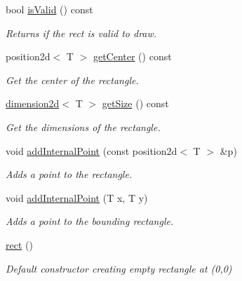 \begin{DoxyCompactItemize}
bool \hyperlink{classirr_1_1core_1_1rect_ad2f5052c13cffb08f6ce8649296ec9df}{is\+Valid} () const
\begin{DoxyCompactList}\small\item\em Returns if the rect is valid to draw. \end{DoxyCompactList}\item 
\mbox{\label{classirr_1_1core_1_1rect_adf7b75a834fde75f5932f2a89a3d75cd}} 
position2d$<$ T $>$ \hyperlink{classirr_1_1core_1_1rect_adf7b75a834fde75f5932f2a89a3d75cd}{get\+Center} () const
\begin{DoxyCompactList}\small\item\em Get the center of the rectangle. \end{DoxyCompactList}\item 
\mbox{\label{classirr_1_1core_1_1rect_aa5e0bf0e6474c1603c735a63843833fa}} 
\hyperlink{classirr_1_1core_1_1dimension2d}{dimension2d}$<$ T $>$ \hyperlink{classirr_1_1core_1_1rect_aa5e0bf0e6474c1603c735a63843833fa}{get\+Size} () const
\begin{DoxyCompactList}\small\item\em Get the dimensions of the rectangle. \end{DoxyCompactList}\item 
void \hyperlink{classirr_1_1core_1_1rect_a0b7496319a32ceda640c730f5822f1ef}{add\+Internal\+Point} (const position2d$<$ T $>$ \&p)
\begin{DoxyCompactList}\small\item\em Adds a point to the rectangle. \end{DoxyCompactList}\item 
void \hyperlink{classirr_1_1core_1_1rect_a25b80222bc003a238fa8f5157bdb8b9d}{add\+Internal\+Point} (T x, T y)
\begin{DoxyCompactList}\small\item\em Adds a point to the bounding rectangle. \end{DoxyCompactList}\item 
\mbox{\label{classirr_1_1core_1_1rect_a04c79e7af6ff14b62e569628c4f83e44}} 
\hyperlink{classirr_1_1core_1_1rect_a04c79e7af6ff14b62e569628c4f83e44}{rect} ()
\begin{DoxyCompactList}\small\item\em Default constructor creating empty rectangle at (0,0) \end{DoxyCompactList}\item 

\end{DoxyCompactItemize}
